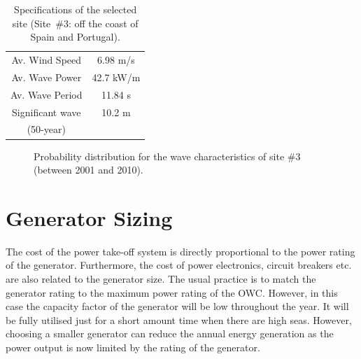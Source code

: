 \documentclass[twocolumn]{article}
\begin{document}
\begin{table}
  \centering
  \begin{tabular}{cc}
    \hline
Av. Wind Speed & 6.98 m/s \\
Av. Wave Power & 42.7 kW/m \\
Av. Wave Period & 11.84 s \\
Significant wave & 10.2 m  \\
(50-year) \\
\hline
  \end{tabular}
  \caption{Specifications of the selected site (Site~\#3: off the coast of Spain and Portugal)\cite{Gao2012}.}
  \label{site_spec}
\end{table}

\begin{figure}[t]
  \centering

    \caption{Probability distribution for the wave characteristics of site \#3 (between 2001 and 2010).} 
    \label{spain_site}
\end{figure} 

\section{Generator Sizing}

The cost of the power take-off system is directly proportional to the power rating of the generator. Furthermore, the cost of power electronics, circuit breakers etc. are also related to the generator size. The usual practice is to match the generator rating to the maximum power rating of the OWC. However, in this case the capacity factor of the generator will be low throughout the year. It will be fully utilised just for a short amount time when there are high seas. However, choosing a smaller generator can reduce the annual energy generation as the power output is now limited by the rating of the generator.
\end{document}
